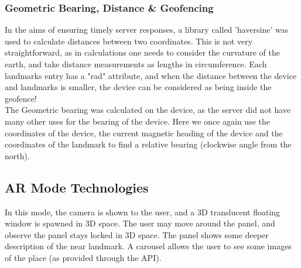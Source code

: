 \subsubsection{Geometric Bearing, Distance \& Geofencing}
In the aims of ensuring timely server responses, a library called 'haversine' was used to calculate distances between two coordinates. This is not very straightforward, 
as in calculations one needs to consider the curvature of the earth, and take distance measurements as lengths in circumference. Each landmarks entry has a "rad" 
attribute, and when the distance between the device and landmarks is smaller, the device can be considered as being inside the geofence!\\
The Geometric bearing was calculated on the device, as the server did not have many other uses for the bearing of the device. Here we once again use the coordinates 
of the device, the current magnetic heading of the device and the coordinates of the landmark to find a relative bearing (clockwise angle from the north).   




\subsection{AR Mode Technologies}
In this mode, the camera is shown to the user, and a 3D translucent floating window is spawned in 3D space.
The user may move around the panel, and observe the panel stays locked in 3D space. The panel shows
some deeper description of the near landmark. A carousel allows the user to see some images of the place
 (as provided through the API). 



